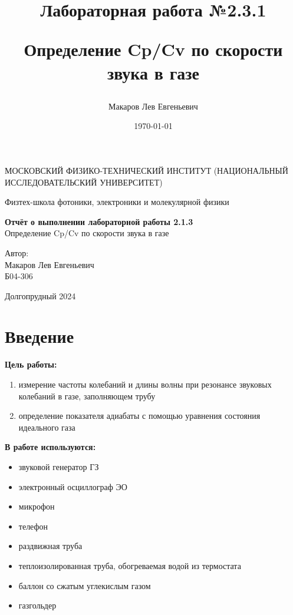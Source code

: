 \documentclass[a4paper,12pt]{article}
\author{Макаров Лев Евгеньевич}
\title{Лабораторная работа №2.3.1

Определение Cp/Cv по скорости звука в газе
}
\date{\today}
\begin{document}
\begin{titlepage}
	\begin{center}
		{\large МОСКОВСКИЙ ФИЗИКО-ТЕХНИЧЕСКИЙ ИНСТИТУТ (НАЦИОНАЛЬНЫЙ ИССЛЕДОВАТЕЛЬСКИЙ УНИВЕРСИТЕТ)}
	\end{center}
	\begin{center}
		{\large Физтех-школа фотоники, электроники и молекулярной физики}
	\end{center}
	
	
	\vspace{4.5cm}
	{\huge
		\begin{center}
			{\bf Отчёт о выполнении лабораторной работы 2.1.3}\\
			Определение Cp/Cv по скорости звука в газе
		\end{center}
	}
	\vspace{2cm}
	\begin{flushright}
		{\LARGE Автор:\\ Макаров Лев Евгеньевич \\
			\vspace{0.2cm}
			Б04-306}
	\end{flushright}
	\vspace{8cm}
	\begin{center}
		Долгопрудный 2024
	\end{center}
\end{titlepage}

\section{Введение}

\textbf{Цель работы:} 
\begin{enumerate}
	\item измерение частоты колебаний и длины волны при резонансе звуковых колебаний в газе, заполняющем трубу
    \item определение показателя адиабаты с помощью уравнения состояния идеального газа
\end{enumerate}

\textbf{В работе используются:} 
\begin{itemize}
    \item звуковой генератор ГЗ
    \item электронный осциллограф ЭО
    \item микрофон
    \item телефон
    \item раздвижная труба
    \item теплоизолированная труба, обогреваемая водой из термостата
    \item баллон со сжатым углекислым газом
    \item газгольдер
\end{itemize}
\medskip
\end{document}
